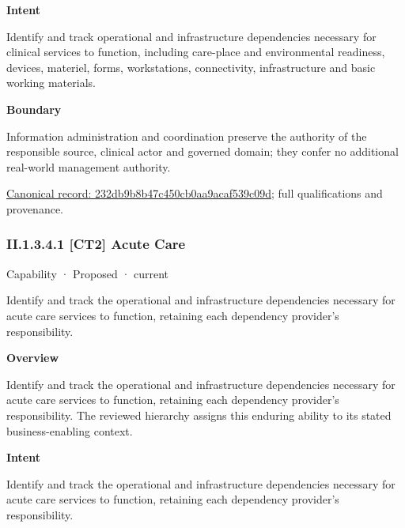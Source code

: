 \textbf{Intent}



Identify and track operational and infrastructure dependencies necessary for clinical services to function, including care-place and environmental readiness, devices, materiel, forms, workstations, connectivity, infrastructure and basic working materials.



\textbf{Boundary}



Information administration and coordination preserve the authority of the responsible source, clinical actor and governed domain; they confer no additional real-world management authority.


{\footnotesize \href{../../../../continuum/strategy/capability/232db9b8b47c450cb0aa9acaf539c09d.md}{Canonical record: 232db9b8b47c450cb0aa9acaf539c09d}; full qualifications and provenance.}\par
\subsubsection*{II.1.3.4.1 [CT2] Acute Care}
\label{navigation:II.1.3.4.1}

\label{element:9bb988c526404522b83aeed5069e0eb5}
{\small Capability · Proposed · current}\par

Identify and track the operational and infrastructure dependencies necessary for acute care services to function, retaining each dependency provider's responsibility.



\textbf{Overview}



Identify and track the operational and infrastructure dependencies necessary for acute care services to function, retaining each dependency provider's responsibility. The reviewed hierarchy assigns this enduring ability to its stated business-enabling context.



\textbf{Intent}



Identify and track the operational and infrastructure dependencies necessary for acute care services to function, retaining each dependency provider's responsibility.



